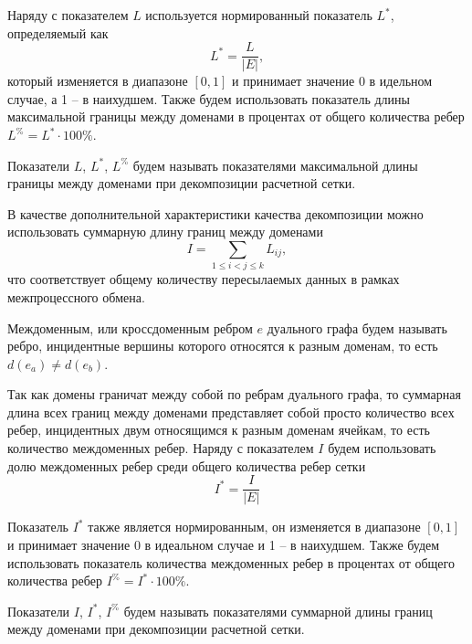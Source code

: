 Наряду с показателем $L$ используется нормированный показатель $L^{*}$, определяемый как
\begin{equation}
	L^{*} = \frac{L}{|E|},
\end{equation}
который изменяется в диапазоне $[0, 1]$ и принимает значение 0 в идельном случае, а 1 -- в наихудшем.
Также будем использовать показатель длины максимальной границы между доменами в процентах от общего количества ребер $L^{\%} = L^{*} \cdot 100\%$.

\begin{definition}
Показатели $L$, $L^{*}$, $L^{\%}$ будем называть показателями максимальной длины границы между доменами при декомпозиции расчетной сетки.
\end{definition}

В качестве дополнительной характеристики качества декомпозиции можно использовать суммарную длину границ между доменами
\begin{equation}
	I = \sum_{1 \le i < j \le k}{L_{ij}},
\end{equation}
что соответствует общему количеству пересылаемых данных в рамках межпроцессного обмена.

\begin{definition}
Междоменным, или кроссдоменным ребром $e$ дуального графа будем называть ребро, инцидентные вершины которого относятся к разным доменам, то есть $d(e_a) \ne d(e_b)$.
\end{definition}

Так как домены граничат между собой по ребрам дуального графа, то суммарная длина всех границ между доменами представляет собой просто количество всех ребер, инцидентных двум относящимся к разным доменам ячейкам, то есть количество междоменных ребер.
Наряду с показателем $I$ будем использовать долю междоменных ребер среди общего количества ребер сетки
\begin{equation}
	I^{*} = \frac{I}{|E|}
\end{equation}

Показатель $I^{*}$ также является нормированным, он изменяется в диапазоне $[0, 1]$ и принимает значение 0 в идеальном случае и 1 -- в наихудшем.
Также будем использовать показатель количества междоменных ребер в процентах от общего количества ребер $I^{\%} = I^{*} \cdot 100\%$.

\begin{definition}
Показатели $I$, $I^{*}$, $I^{\%}$ будем называть показателями суммарной длины границ между доменами при декомпозиции расчетной сетки.
\end{definition}

